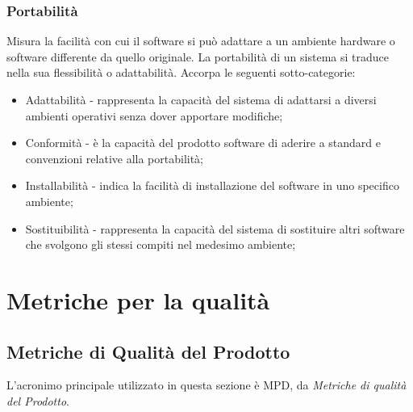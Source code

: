 \documentclass[10pt]{article}
\begin{document}
\begin{justify}
        \subsubsection{Portabilità}
        Misura la facilità con cui il software si può adattare a un ambiente hardware o software differente da quello originale. La portabilità di un sistema si
        traduce nella sua flessibilità o adattabilità. Accorpa le seguenti sotto-categorie:
        \begin{itemize}
            \item Adattabilità - rappresenta la capacità del sistema di adattarsi a diversi ambienti operativi senza dover apportare modifiche;
            \item Conformità - è la capacità del prodotto software di aderire a standard e convenzioni relative alla portabilità;
            \item Installabilità - indica la facilità di installazione del software in uno specifico ambiente;
            \item Sostituibilità - rappresenta la capacità del sistema di sostituire altri software che svolgono gli stessi compiti nel medesimo ambiente;
        \end{itemize}

\newpage

\section{Metriche per la qualità}
\label{metriche_qualita}
\subsection{Metriche di Qualità del Prodotto}
L'acronimo principale utilizzato in questa sezione è MPD, da \textit{Metriche di qualità del Prodotto}.


\end{justify}
\end{document}
